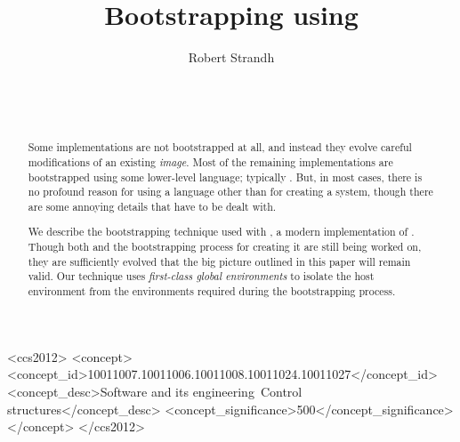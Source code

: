 \documentclass{sig-alternate-05-2015}
\def\inputtex#1{}
\begin{document}
\title{Bootstrapping \commonlisp{} using \commonlisp{}}
\author{\alignauthor
Robert Strandh\\
\\
\\
\\
}


\maketitle

\begin{abstract}
Some \commonlisp{} implementations are not bootstrapped at all, and
instead they evolve careful modifications of an existing \emph{image}.
Most of the remaining implementations are bootstrapped using some
lower-level language; typically \clanguage{}.  But, in most cases,
there is no profound reason for using a language other than
\commonlisp{} for creating a \commonlisp{} system, though there are
some annoying details that have to be dealt with.

We describe the bootstrapping technique used with \sicl{}, a modern
implementation of \commonlisp{}.  Though both \sicl{} and the
bootstrapping process for creating it are still being worked on, they
are sufficiently evolved that the big picture outlined in this paper
will remain valid.  Our technique uses \emph{first-class global
  environments} to isolate the host environment from the environments
required during the bootstrapping process.
\end{abstract}

\begin{CCSXML}
  <ccs2012>
  <concept>
  <concept_id>10011007.10011006.10011008.10011024.10011027</concept_id>
  <concept_desc>Software and its engineering~Control structures</concept_desc>
  <concept_significance>500</concept_significance>
  </concept>
  </ccs2012>
\end{CCSXML}


\printccsdesc


\inputtex{sec-introduction.tex}
\inputtex{sec-previous.tex}
\inputtex{sec-our-method.tex}
\inputtex{sec-benefits.tex}
\inputtex{sec-conclusions.tex}
\inputtex{sec-acknowledgments.tex}



\end{document}
